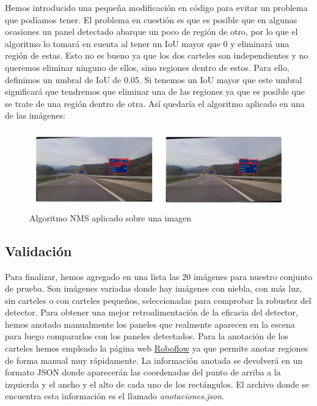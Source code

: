 \documentclass[a4paper, 12pt]{article}
\begin{document}
Hemos introducido una pequeña modificación en código para evitar un problema que podíamos tener. El problema en cuestión es que es posible que en algunas ocasiones un panel detectado abarque un poco de región de otro, por lo que el algoritmo lo tomará en cuenta al tener un IoU mayor que 0 y eliminará una región de estas. Esto no es bueno ya que los dos carteles son independientes y no queremos eliminar ninguno de ellos, sino regiones dentro de estos. Para ello, definimos un umbral de IoU de 0.05. Si tenemos un IoU mayor que este umbral significará que tendremos que eliminar una de las regiones ya que es posible que se trate de una región dentro de otra. Así quedaría el algoritmo aplicado en una de las imágenes:
\begin{figure}[h]
	\centering
	\includegraphics[width=1\linewidth]{img/nmsAplicado.png}
	\caption{Algoritmo NMS aplicado sobre una imagen}
	\label{fig:nmsAplicado}
\end{figure}
\subsection{Validación}
Para finalizar, hemos agregado en una lista las 20 imágenes para nuestro conjunto de prueba. Son imágenes variadas donde hay imágenes con niebla, con más luz, sin carteles o con carteles pequeños, seleccionadas para comprobar la robustez del detector. Para obtener una mejor retroalimentación de la eficacia del detector, hemos anotado manualmente los paneles que realmente aparecen en la escena para luego compararlos con los paneles detectados. Para la anotación de los carteles hemos empleado la página web \href{https://roboflow.com/}{Roboflow} ya que permite anotar regiones de forma manual muy rápidamente. La información anotada se devolverá en un formato JSON donde aparecerán las coordenadas del punto de arriba a la izquierda y el ancho y el alto de cada uno de los rectángulos. El archivo donde se encuentra esta información es el llamado \textit{anotaciones.json}.
\end{document}
